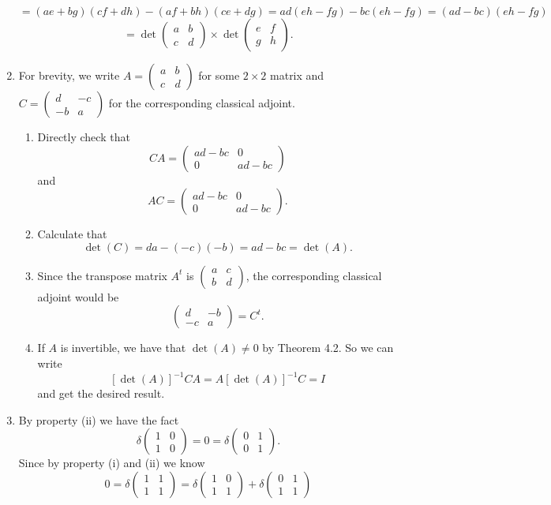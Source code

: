 \begin{enumerate}
\[=(ae+bg)(cf+dh)-(af+bh)(ce+dg)=ad(eh-fg)-bc(eh-fg)=(ad-bc)(eh-fg)\]
\[=\det\begin{pmatrix}a&b\\c&d\end{pmatrix}\times \det\begin{pmatrix}e&f\\g&h\end{pmatrix}.\]
\item For brevity, we write $A=\begin{pmatrix}a&b\\c&d\end{pmatrix}$ for some $2\times 2$ matrix and $C=\begin{pmatrix}d&-c\\-b&a\end{pmatrix}$ for the corresponding classical adjoint.\begin{enumerate}
\item Directly check that 
\[CA=\begin{pmatrix}ad-bc&0\\0&ad-bc\end{pmatrix}\]
and
\[AC=\begin{pmatrix}ad-bc&0\\0&ad-bc\end{pmatrix}.\]
\item Calculate that 
\[\det(C)=da-(-c)(-b)=ad-bc=\det(A).\]
\item Since the transpose matrix $A^t$ is $\begin{pmatrix}a&c\\b&d\end{pmatrix}$, the corresponding classical adjoint would be 
\[\begin{pmatrix}d&-b\\-c&a\end{pmatrix}=C^t.\]
\item If $A$ is invertible, we have that $\det(A)\neq 0$ by Theorem 4.2. So we can write 
\[[\det(A)]^{-1}CA=A[\det(A)]^{-1}C=I\]
and get the desired result.
\end{enumerate}
\item By property (ii) we have the fact 
\[\delta\begin{pmatrix}1&0\\1&0\end{pmatrix}=0=\delta\begin{pmatrix}0&1\\0&1\end{pmatrix}.\]
Since by property (i) and (ii) we know \[0=\delta\begin{pmatrix}1&1\\1&1\end{pmatrix}=\delta\begin{pmatrix}1&0\\1&1\end{pmatrix}+\delta\begin{pmatrix}0&1\\1&1\end{pmatrix}\]

\end{enumerate}
